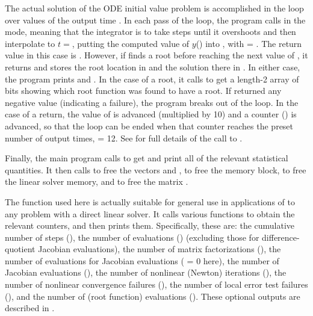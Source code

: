 The actual solution of the ODE initial value problem is accomplished in
the loop over values of the output time .  In each pass of the
loop, the program calls  in the  mode, meaning that
the integrator is to take steps until it overshoots  and then
interpolate to $t = $, putting the computed value of $y$()
into , with  = .  The return value in this case is
.  However, if  finds a root before reaching the next
value of , it returns  and stores the root
location in  and the solution there in .  In either case, the
program prints  and .  In the case of a root, it calls
 to get a length-2 array  of bits showing
which root function was found to have a root.  If  returned any
negative value (indicating a failure), the program breaks out of the loop.  
In the case of a  return, the value of  is
advanced (multiplied by 10) and a counter () is advanced, so
that the loop can be ended when that counter reaches the preset number
of output times,  = 12.  See  for full
details of the call to .

Finally, the main program calls  to get and print
all of the relevant statistical quantities.  It then calls 
to free the vectors  and ,  to free the 
{\cvode} memory block,  to free the linear solver
memory, and  to free the matrix .

The function  used here is actually suitable for
general use in applications of {\cvode} to any problem with a direct
linear solver.  It calls various  
functions to obtain the relevant counters, and then prints them.
Specifically, these are: the cumulative number of steps (), 
the number of  evaluations () (excluding those for
difference-quotient Jacobian evaluations),
the number of matrix factorizations (),
the number of  evaluations for Jacobian evaluations (
= 0 here),
the number of Jacobian evaluations (),
the number of nonlinear (Newton) iterations (),
the number of nonlinear convergence failures (),
the number of local error test failures (), and
the number of  (root function) evaluations ().
These optional outputs are described in .

